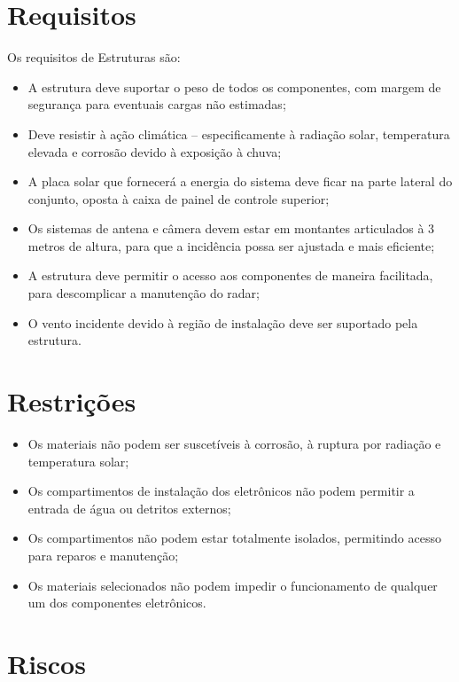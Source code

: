 \section{Requisitos}

Os requisitos de Estruturas são:


\begin{itemize}
\item A estrutura deve suportar o peso de todos os componentes, com margem de segurança para eventuais cargas não estimadas;
\item Deve resistir à ação climática -- especificamente à radiação solar, temperatura elevada e corrosão devido à exposição à chuva;
\item A placa solar que fornecerá a energia do sistema deve ficar na parte lateral do conjunto, oposta à caixa de painel de controle superior;
\item Os sistemas de antena e câmera devem estar em montantes articulados à 3 metros de altura, para que a incidência possa ser ajustada e mais eficiente;
\item A estrutura deve permitir o acesso aos componentes de maneira facilitada, para descomplicar a manutenção do radar;
\item O vento incidente devido à região de instalação deve ser suportado pela estrutura.
\end{itemize}

\section{Restrições}
\begin{itemize}
\item Os materiais não podem ser suscetíveis à corrosão, à ruptura por radiação e temperatura solar;
\item Os compartimentos de instalação dos eletrônicos não podem permitir a entrada de água ou detritos externos;
\item Os compartimentos não podem estar totalmente isolados, permitindo acesso para reparos e manutenção;
\item Os materiais selecionados não podem impedir o funcionamento de qualquer um dos componentes eletrônicos.
\end{itemize}

\section{Riscos}

